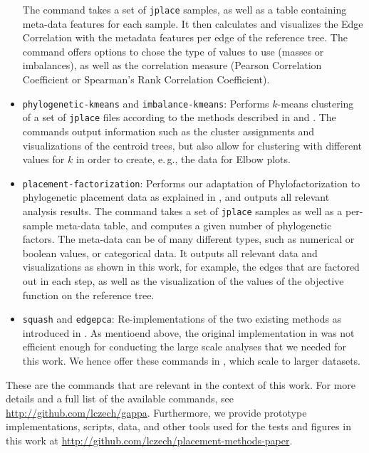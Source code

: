 \begin{itemize}
          The command takes a set of \texttt{jplace} samples, as well as a table containing meta-data features for each sample.
          It then calculates and visualizes the Edge Correlation with the metadata features per
          edge of the reference tree.
          The command offers options to chose the type of values to use (masses or imbalances),
          as well as the correlation measure (Pearson Correlation Coefficient or Spearman's Rank Correlation Coefficient).
    \item \texttt{phylogenetic-kmeans} and \texttt{imbalance-kmeans}: Performs $k$-means clustering of a set of \texttt{jplace}
          files according to the methods described in 
          and .
          The commands output information such as the cluster assignments and visualizations of the centroid trees,
          but also allow for clustering with different values for $k$ in order to create, e.\,g.,
          the data for Elbow plots.
    \item \texttt{placement-factorization}:
          Performs our adaptation of Phylofactorization \cite{Washburne2017a} to phylogenetic placement data
          as explained in , and outputs all relevant analysis results.
          The command takes a set of \texttt{jplace} samples as well as a per-sample meta-data table,
          and computes a given number of phylogenetic factors.
          The meta-data can be of many different types, such as numerical or boolean values, or categorical data.
          It outputs all relevant data and visualizations as shown in this work,
          for example, the edges that are factored out in each step, as well as the visualization of the
          values of the objective function on the reference tree.
    \item \texttt{squash} and \texttt{edgepca}:
          Re-implementations of the two existing methods \cite{Matsen2011a,Evans2012} as introduced
          in .
          As mentioend above, the original implementation in  was not efficient enough for conducting
          the large scale analyses that we needed for this work.
          We hence offer these commands in , which scale to larger datasets.
\end{itemize}

These are the  commands that are relevant in the context of this work.
For more details and a full list of the available commands, see \url{http://github.com/lczech/gappa}.
Furthermore, we provide prototype implementations, scripts, data, and other tools
used for the tests and figures in this work at \url{http://github.com/lczech/placement-methods-paper}.

